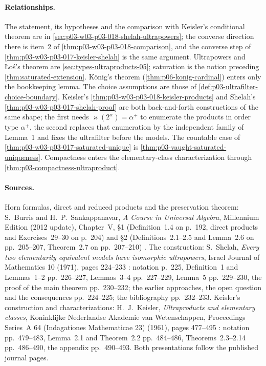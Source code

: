 \paragraph{Relationships.}  The statement, its hypotheses and the comparison
with Keisler's conditional theorem are in
\cref{sec:p03-w03-p03-018-shelah-ultrapowers}; the converse direction there
is item~2 of \cref{thm:p03-w03-p03-018-comparison}, and the converse step of
\cref{thm:p03-w03-p03-017-keisler-shelah} is the same argument.  Ultrapowers
and \L o\'s's theorem are \cref{sec:types-ultraproducts-05}; saturation is
the notion preceding \cref{thm:saturated-extension}.  K\"onig's theorem
(\cref{thm:p06-konig-cardinal}) enters only the bookkeeping lemma.  The
choice assumptions are those of \cref{def:p03-ultrafilter-choice-boundary}.
Keisler's \cref{thm:p03-w03-p03-018-keisler-products} and Shelah's
\cref{thm:p03-w03-p03-017-shelah-proof} are both back-and-forth
constructions of the same shape; the first needs
\(\varkappa(2^\alpha)=\alpha^+\) to enumerate the products in order type
\(\alpha^+\), the second replaces that enumeration by the independent family
of Lemma~1 and fixes the ultrafilter before the models.  The countable case of
\cref{thm:p03-w03-p03-017-saturated-unique} is
\cref{thm:p03-vaught-saturated-uniqueness}.  Compactness enters the
elementary-class characterization through
\cref{thm:p03-compactness-ultraproduct}.

\paragraph{Sources.}  Horn formulas, direct and reduced products and the
preservation theorem: S.~Burris and H.~P.~Sankappanavar, \emph{A Course in
Universal Algebra}, Millennium Edition (2012 update), Chapter~V, \S1
(Definition~1.4 on p.~192, direct products and Exercises~29--30 on p.~204)
and \S2 (Definitions~2.1--2.5 and Lemma~2.6 on pp.~205--207, Theorem~2.7 on
pp.~207--210) \cite{BurrisSankappanavar2012}.  The construction: S.~Shelah,
\emph{Every two elementarily equivalent models have isomorphic
ultrapowers}, Israel Journal of Mathematics 10 (1971), pages 224--233
\cite{Shelah1971Ultrapowers}: notation p.~225, Definition~1 and Lemmas~1--2
pp.~226--227, Lemmas~3--4 pp.~227--229, Lemma~5 pp.~229--230, the proof of
the main theorem pp.~230--232; the earlier approaches, the open question and
the consequences pp.~224--225; the bibliography pp.~232--233.  Keisler's
construction and characterizations: H.~J.~Keisler, \emph{Ultraproducts and
elementary classes}, Koninklijke Nederlandse Akademie van Wetenschappen,
Proceedings Series~A 64 (Indagationes Mathematicae 23) (1961), pages
477--495 \cite{Keisler1961ElementaryClasses}: notation pp.~479--483,
Lemma~2.1 and Theorem~2.2 pp.~484--486, Theorems~2.3--2.14 pp.~486--490, the
appendix pp.~490--493.  Both presentations follow the published journal
pages.
